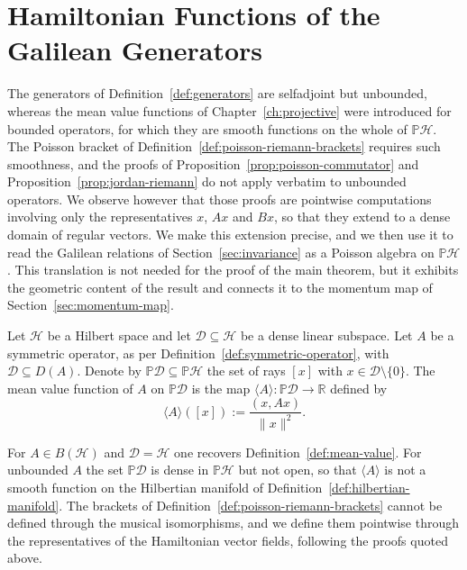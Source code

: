 \section{Hamiltonian Functions of the Galilean Generators}
\label{sec:galilean-functions}

The generators of Definition~\ref{def:generators} are selfadjoint but unbounded, whereas the mean value functions of Chapter~\ref{ch:projective} were introduced for bounded operators, for which they are smooth functions on the whole of $\mathbb{P}\mathcal{H}$. The Poisson bracket of Definition~\ref{def:poisson-riemann-brackets} requires such smoothness, and the proofs of Proposition~\ref{prop:poisson-commutator} and Proposition~\ref{prop:jordan-riemann} do not apply verbatim to unbounded operators. We observe however that those proofs are pointwise computations involving only the representatives $x$, $Ax$ and $Bx$, so that they extend to a dense domain of regular vectors. We make this extension precise, and we then use it to read the Galilean relations of Section~\ref{sec:invariance} as a Poisson algebra on $\mathbb{P}\mathcal{H}$. This translation is not needed for the proof of the main theorem, but it exhibits the geometric content of the result and connects it to the momentum map of Section~\ref{sec:momentum-map}.

\begin{definition}\label{def:mean-value-domain}
	Let $\mathcal{H}$ be a Hilbert space and let $\mathcal{D}\subseteq\mathcal{H}$ be a dense linear subspace. Let $A$ be a symmetric operator, as per Definition~\ref{def:symmetric-operator}, with $\mathcal{D}\subseteq D(A)$. Denote by $\mathbb{P}\mathcal{D}\subseteq\mathbb{P}\mathcal{H}$ the set of rays $[x]$ with $x\in\mathcal{D}\setminus\{0\}$. The mean value function of $A$ on $\mathbb{P}\mathcal{D}$ is the map $\langle A\rangle:\mathbb{P}\mathcal{D}\to\mathbb{R}$ defined by
	\begin{equation}
		\langle A\rangle([x]) := \frac{(x,Ax)}{\|x\|^2}.
	\end{equation}
\end{definition}

\begin{remark}
	For $A\in B(\mathcal{H})$ and $\mathcal{D}=\mathcal{H}$ one recovers Definition~\ref{def:mean-value}. For unbounded $A$ the set $\mathbb{P}\mathcal{D}$ is dense in $\mathbb{P}\mathcal{H}$ but not open, so that $\langle A\rangle$ is not a smooth function on the Hilbertian manifold of Definition~\ref{def:hilbertian-manifold}. The brackets of Definition~\ref{def:poisson-riemann-brackets} cannot be defined through the musical isomorphisms, and we define them pointwise through the representatives of the Hamiltonian vector fields, following the proofs quoted above.
\end{remark}

